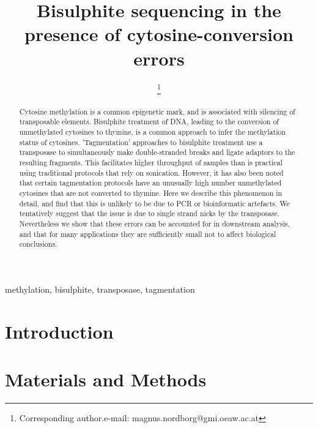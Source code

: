 \documentclass[useAMS,usenatbib]{tellus}
\begin{document}
\title[Bisulphite sequencing in the presence of cytosine-conversion errors]{Bisulphite sequencing in the presence of cytosine-conversion errors}

\author[\centering AUTHOR]{
    \thanks{Corresponding author.\hfil\break e-mail: magnus.nordborg@gmi.oeaw.ac.at}}



\maketitle

\begin{abstract}
Cytosine methylation is a common epigenetic mark, and is associated with silencing of transposable elements.
Bisulphite treatment of DNA, leading to the conversion of unmethylated cytosines to thymine, is a common approach to infer the methylation status of cytosines.
'Tagmentation' approaches to bisulphite treatment use a transposase to simultaneously make double-stranded breaks and ligate adaptors to the resulting fragments.
This facilitates higher throughput of samples than is practical using traditional protocols that rely on sonication.
However, it has also been noted that certain tagmentation protocols have an unusually high number unmethylated cytosines that are not converted to thymine.
Here we describe this phenomenon in detail, and find that this is unlikely to be due to PCR or bioinformatic artefacts.
We tentatively suggest that the issue is due to single strand nicks by the transposase.
Nevertheless we show that these errors can be accounted for in downstream analysis, and that for many applications they are sufficiently small not to affect biological conclusions.
\end{abstract}

\begin{keywords}
methylation, bisulphite, transposase, tagmentation
\end{keywords}

\section{Introduction}

\section{Materials and Methods}
\end{document}
